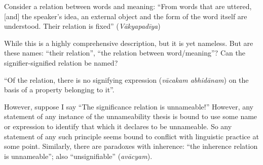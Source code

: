 \begin{myquote}
Consider a relation between words and meaning: “From words that are uttered, [and] the speaker's idea, an external object and the form of the word itself are understood. Their relation is fixed” (\textsl{Vākyapadīya}) 

While this is a highly comprehensive description, but it is yet nameless. But are these names: “their relation”, “the relation between word/meaning”? Can the signifier-signified relation be named? 

“Of the relation, there is no signifying expression (\textsl{vācakam abhidānam}) on the basis of a property belonging to it”. 

However, suppose I say “The significance relation is unnameable!” However, any statement of any instance of the unnameability thesis is bound to use some name or expression to identify that which it declares to be unnameable. So any statement of any such principle seems bound to conflict with linguistic practice at some point. Similarly, there are paradoxes with inherence: “the inherence relation is unnameable”; also “unsignifiable” (\textsl{avācyam}).
\end{myquote}

